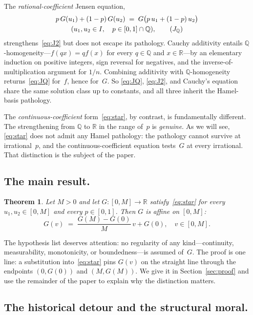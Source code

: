 \documentclass{article}
\theoremstyle{plain}
\newtheorem{theorem}{Theorem}
\theoremstyle{definition}
\newcommand{\R}{\mathbb{R}}
\newcommand{\Q}{\mathbb{Q}}
\begin{document}
The \emph{rational-coefficient} Jensen equation,
\begin{multline}
p\,G(u_1)+(1-p)\,G(u_2)
  \;=\; G\bigl(p\,u_1+(1-p)\,u_2\bigr) \\
  (u_1,u_2\in I,\quad p\in[0,1]\cap\Q),
\tag{$J_\Q$}\label{eq:JQ}
\end{multline}
strengthens~\eqref{eq:J2} but does not escape its pathology. Cauchy
additivity entails $\Q$-homogeneity---$f(qx)=qf(x)$ for every $q\in\Q$
and $x\in\R$---by an elementary induction on positive integers, sign
reversal for negatives, and the inverse-of-multiplication argument for
$1/n$. Combining additivity with $\Q$-homogeneity
returns~\eqref{eq:JQ} for~$f$, hence for~$G$. So \eqref{eq:JQ},
\eqref{eq:J2}, and Cauchy's equation share the same solution class up to
constants, and all three inherit the Hamel-basis pathology.

The \emph{continuous-coefficient} form~\eqref{eq:star}, by contrast, is
fundamentally different. The strengthening from $\Q$ to $\R$ in the
range of~$p$ is \emph{genuine}. As we will see, \eqref{eq:star} does not
admit any Hamel pathology: the pathology cannot survive at irrational~$p$,
and the continuous-coefficient equation tests~$G$ at every irrational.
That distinction is the subject of the paper.

\subsection{The main result.}

\begin{theorem}\label{thm:main}
Let $M>0$ and let $G\colon[0,M]\to\R$ satisfy~\eqref{eq:star} for every
$u_1,u_2\in[0,M]$ and every $p\in[0,1]$. Then $G$ is affine on $[0,M]$:
\[
G(v) \;=\; \frac{G(M)-G(0)}{M}\,v + G(0), \quad v\in[0,M].
\]
\end{theorem}

The hypothesis list deserves attention: no regularity of any
kind---continuity, measurability, monotonicity, or boundedness---is
assumed of~$G$. The proof is one line: a substitution into~\eqref{eq:star} pins
$G(v)$ on the straight line through the endpoints $(0,G(0))$ and
$(M,G(M))$.
We give it in Section~\ref{sec:proof} and use the remainder of the paper
to explain why the distinction matters.

\subsection{The historical detour and the structural moral.}
\label{ssec:detour}
\end{document}

